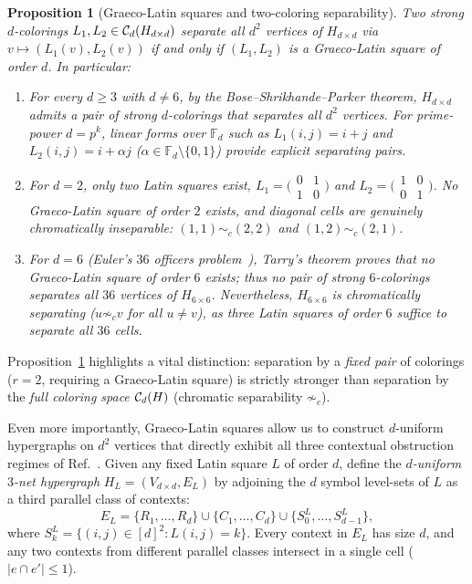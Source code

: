 \documentclass[aps,pra,reprint,superscriptaddress,longbibliography,nofootinbib,floatfix,10pt]{revtex4-2}
\newtheorem{proposition}[theorem]{Proposition}
\theoremstyle{definition}\newtheorem{definition}[theorem]{Definition}
\theoremstyle{remark}\newtheorem{remark}[theorem]{Remark}
\newcommand{\F}{\mathbb F}\newcommand{\Z}{\mathbb Z}\newcommand{\PP}{\mathbb P}
\begin{document}
\begin{proposition}[Graeco-Latin squares and two-coloring separability]\label{prop:graeco-sep}
Two strong $d$-colorings $L_1,L_2\in\mathcal C_d(H_{d\times d})$ separate all $d^2$ vertices of $H_{d\times d}$ via $v\mapsto(L_1(v),L_2(v))$ if and only if $(L_1,L_2)$ is a Graeco-Latin square of order $d$. In particular:
\begin{enumerate}
\item For every $d\ge 3$ with $d\neq 6$, by the Bose--Shrikhande--Parker theorem, $H_{d\times d}$ admits a pair of strong $d$-colorings that separates all $d^2$ vertices. For prime-power $d=p^k$, linear forms over $\F_d$ such as $L_1(i,j)=i+j$ and $L_2(i,j)=i+\alpha j$ ($\alpha\in\F_d\setminus\{0,1\}$) provide explicit separating pairs.
\item For $d=2$, only two Latin squares exist, $L_1=\bigl(\begin{smallmatrix}0&1\\1&0\end{smallmatrix}\bigr)$ and $L_2=\bigl(\begin{smallmatrix}1&0\\0&1\end{smallmatrix}\bigr)$. No Graeco-Latin square of order $2$ exists, and diagonal cells are genuinely chromatically inseparable: $(1,1)\sim_c(2,2)$ and $(1,2)\sim_c(2,1)$.
\item For $d=6$ (Euler's $36$ officers problem~\cite{Euler60}), Tarry's theorem proves that no Graeco-Latin square of order $6$ exists; thus \emph{no pair} of strong $6$-colorings separates all $36$ vertices of $H_{6\times 6}$. Nevertheless, $H_{6\times 6}$ is chromatically separating ($u\not\sim_c v$ for all $u\neq v$), as three Latin squares of order $6$ suffice to separate all $36$ cells.
\end{enumerate}
\end{proposition}

Proposition~\ref{prop:graeco-sep} highlights a vital distinction: separation by a \emph{fixed pair} of colorings ($r=2$, requiring a Graeco-Latin square) is strictly stronger than separation by the \emph{full coloring space} $\mathcal C_d(H)$ (chromatic separability $\not\sim_c$).

Even more importantly, Graeco-Latin squares allow us to construct $d$-uniform hypergraphs on $d^2$ vertices that directly exhibit all three contextual obstruction regimes of Ref.~\cite{svozil-2025-color}. Given any fixed Latin square $L$ of order $d$, define the \emph{$d$-uniform $3$-net hypergraph} $H_L=(V_{d\times d},E_L)$ by adjoining the $d$ symbol level-sets of $L$ as a third parallel class of contexts:
\begin{equation}\label{eq:3net}
E_L=\{R_1,\ldots,R_d\}\cup\{C_1,\ldots,C_d\}\cup\{S_0^L,\ldots,S_{d-1}^L\},
\end{equation}
where $S_k^L=\{(i,j)\in[d]^2:L(i,j)=k\}$. Every context in $E_L$ has size $d$, and any two contexts from different parallel classes intersect in a single cell ($|e\cap e'|\le 1$).
\end{document}

